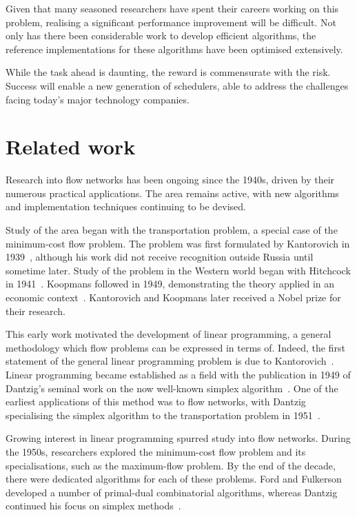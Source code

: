 Given that many seasoned researchers have spent their careers working on this problem, realising a significant performance improvement will be difficult. Not only has there been considerable work to develop efficient algorithms, the reference implementations for these algorithms have been optimised extensively.

While the task ahead is daunting, the reward is commensurate with the risk. Success will enable a new generation of schedulers, able to address the challenges facing today's major technology companies.

\section{Related work} \label{sec:intro-related-work}

Research into flow networks has been ongoing since the 1940s, driven by their numerous practical applications. The area remains active, with new algorithms and implementation techniques continuing to be devised.

Study of the area began with the transportation problem, a special case of the minimum-cost flow problem. The problem was first formulated by Kantorovich in 1939~\cite{Kantorovich:1960}, although his work did not receive recognition outside Russia until sometime later. Study of the problem in the Western world began with Hitchcock in 1941~\cite{Hitchcock:1941}. Koopmans followed in 1949, demonstrating the theory applied in an economic context~\cite{Koopmans:1949}. Kantorovich and Koopmans later received a Nobel prize for their research\footnotemark.

This early work motivated the development of linear programming, a general methodology which flow problems can be expressed in terms of. Indeed, the first statement of the general linear programming problem is due to Kantorovich~\cite{Kantorovich:1960}. Linear programming became established  as a field with the publication in 1949 of Dantzig's seminal work on the now well-known simplex algorithm~\cite{Dantzig:1949}. One of the earliest applications of this method was to flow networks, with Dantzig specialising the simplex algorithm to the transportation problem in 1951~\cite{Dantzig:1951}.

Growing interest in linear programming spurred study into flow networks. During the 1950s, researchers explored the minimum-cost flow problem and its specialisations, such as the maximum-flow problem. By the end of the decade, there were dedicated algorithms for each of these problems. Ford and Fulkerson developed a number of primal-dual combinatorial algorithms, whereas Dantzig continued his focus on simplex methods~\cite{FordFulkerson:1962,Dantzig:1962}.

